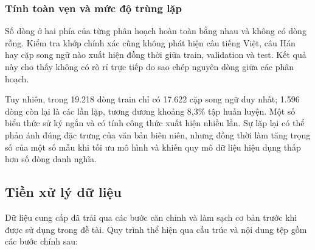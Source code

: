 \subsubsection{Tính toàn vẹn và mức độ trùng lặp}

Số dòng ở hai phía của từng phân hoạch hoàn toàn bằng nhau và không có dòng rỗng. Kiểm tra khớp chính xác cũng không phát hiện câu tiếng Việt, câu Hán hay cặp song ngữ nào xuất hiện đồng thời giữa train, validation và test. Kết quả này cho thấy không có rò rỉ trực tiếp do sao chép nguyên dòng giữa các phân hoạch.

Tuy nhiên, trong 19.218 dòng train chỉ có 17.622 cặp song ngữ duy nhất; 1.596 dòng còn lại là các lần lặp, tương đương khoảng 8,3\% tập huấn luyện. Một số biểu thức sử ký ngắn và có tính công thức xuất hiện nhiều lần. Sự lặp lại có thể phản ánh đúng đặc trưng của văn bản biên niên, nhưng đồng thời làm tăng trọng số của một số mẫu khi tối ưu mô hình và khiến quy mô dữ liệu hiệu dụng thấp hơn số dòng danh nghĩa.

\subsection{Tiền xử lý dữ liệu}

Dữ liệu cung cấp đã trải qua các bước căn chỉnh và làm sạch cơ bản trước khi được sử dụng trong đề tài. Quy trình thể hiện qua cấu trúc và nội dung tệp gồm các bước chính sau:


